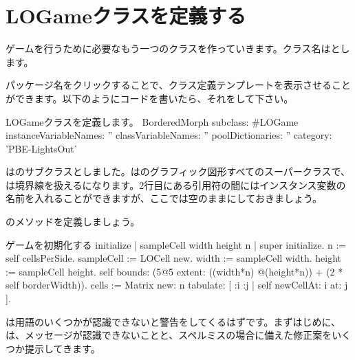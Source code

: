 \documentclass[a4paper,10pt,twoside]{book}
\begin{document}

\section{LOGameクラスを定義する}

ゲームを行うために必要なもう一つのクラスを作っていきます。クラス名はとします。


パッケージ名をクリックすることで、クラス定義テンプレートを表示させることができます。以下のようにコードを書いたら、それをして下さい。

\begin{classdef}[sbegame]{LOGameクラスを定義します。}
BorderedMorph subclass: #LOGame
   instanceVariableNames: ''
   classVariableNames: ''
   poolDictionaries: ''
   category: 'PBE-LightsOut'
\end{classdef}

はのサブクラスとしました。は\pharo のグラフィック図形すべてのスーパークラスで、は境界線を扱えるになります。2行目にある引用符の間にはインスタンス変数の名前を入れることができますが、ここでは空のままにしておきましょう。

のメソッドを定義しましょう。


\begin{numMethod}[sbegameinitialize]{ゲームを初期化する}
initialize
   | sampleCell width height n |
   super initialize.
   n := self cellsPerSide.
   sampleCell := LOCell new.
   width := sampleCell width.
   height := sampleCell height.
   self bounds: (5@5 extent: ((width*n) @(height*n)) + (2 * self borderWidth)).
   cells := Matrix new: n tabulate: [ :i :j | self newCellAt: i at: j ].
\end{numMethod}


\pharo は用語のいくつかが認識できないと警告をしてくるはずです。まずはじめに、\pharo は、メッセージが認識できないことと、スペルミスの場合に備えた修正案をいくつか提示してきます。
\end{document}
